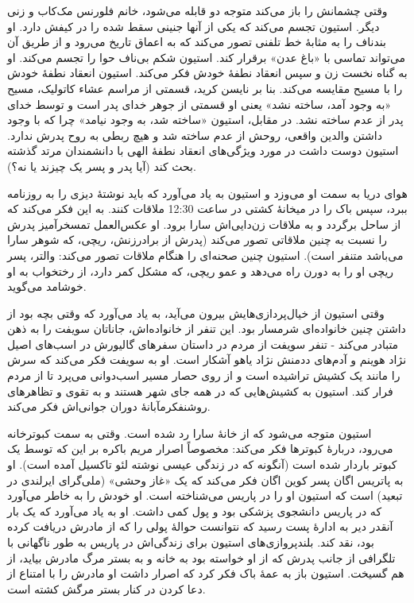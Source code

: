 \documentclass[12pt]{book}
\begin{document}
    وقتی چشمانش را باز می‌کند متوجه دو قابله می‌شود، خانم فلورنس مک‌کاب و زنی دیگر. استیون تجسم می‌کند که یکی از آنها جنینی سقط شده را در کیفش دارد. او بندناف را به مثابۀ خط تلفنی تصور می‌کند که به اعماق تاریخ می‌رود و از طریق آن می‌تواند تماسی با «باغ عدن» برقرار کند. استیون شکم بی‌ناف حوا را تجسم می‌کند. او به گناه نخست زن و سپس انعقاد نطفۀ خودش فکر می‌کند. استیون انعقاد نطفۀ خودش را با مسیح مقایسه می‌کند. بنا بر نایسن کرید، قسمتی از مراسم عشاء کاتولیک، مسیح «به وجود آمد، ساخته نشد» یعنی او قسمتی از جوهر خدای پدر است و توسط خدای پدر از عدم ساخته نشد. در مقابل، استیون «ساخته شد، به وجود نیامد» چرا که با وجود داشتن والدین واقعی، روحش از عدم ساخته شد و هیچ ربطی به روح پدرش ندارد. استیون دوست داشت در مورد ویژگی‌های انعقاد نطفۀ الهی با دانشمندان مرتد گذشته بحث کند (آیا پدر و پسر یک چیزند یا نه؟).

    هوای دریا به سمت او می‌وزد و استیون به یاد می‌آورد که باید نوشتۀ دیزی را به روزنامه ببرد، سپس باک را در میخانۀ کشتی در ساعت 12:30 ملاقات کنند. به این فکر می‌کند که از ساحل برگردد و به ملاقات زن‌دایی‌اش سارا برود. او عکس‌العمل تمسخرآمیز پدرش را نسبت به چنین ملاقاتی تصور می‌کند (پدرش از برادرزنش، ریچی، که شوهر سارا می‌باشد متنفر است). استیون چنین صحنه‌ای را هنگام ملاقات تصور می‌کند: والتر، پسر ریچی او را به دورن راه می‌دهد و عمو ریچی، که مشکل کمر دارد، از رختخواب به او خوشامد می‌گوید.

    وقتی استیون از خیال‌پردازی‌هایش بیرون می‌آید، به یاد می‌آورد که وقتی بچه بود از داشتن چنین خانواده‌ای شرمسار بود. این تنفر از خانواده‌اش، جاناتان سویفت را به ذهن متبادر می‌کند - تنفر سویفت از مردم در داستان سفرهای گالیورش در اسب‌های اصیل نژاد هوینم و آدم‌های ددمنش نژاد یاهو آشکار است. او به سویفت فکر می‌کند که سرش را مانند یک کشیش تراشیده است و از روی حصار مسیر اسب‌دوانی می‌پرد تا از مردم فرار کند. استیون به کشیش‌هایی که در همه جای شهر هستند و به تقوی و تظاهرهای روشنفکرمآبانۀ دوران جوانی‌اش فکر می‌کند.

    استیون متوجه می‌شود که از خانۀ سارا رد شده است. وقتی به سمت کبوترخانه می‌رود، دربارۀ کبوترها فکر می‌کند: مخصوصاً اصرار مریم باکره بر این که توسط یک کبوتر باردار شده است (آنگونه که در زندگی عیسی نوشته لئو تاکسیل آمده است). او به پاتریس اگان پسر کوین اگان فکر می‌کند که یک «غاز وحشی» (ملی‌گرای ایرلندی در تبعید) است که استیون او را در پاریس می‌شناخته است. او خودش را به خاطر می‌آورد که در پاریس دانشجوی پزشکی بود و پول کمی داشت. او به یاد می‌آورد که یک بار آنقدر دیر به ادارۀ پست رسید که نتوانست حوالۀ پولی را که از مادرش دریافت کرده بود، نقد کند. بلندپروازی‌های استیون برای زندگی‌اش در پاریس به طور ناگهانی با تلگرافی از جانب پدرش که از او خواسته بود به خانه و به بستر مرگ مادرش بیاید، از هم گسیخت. استیون باز به عمۀ باک فکر کرد که اصرار داشت او مادرش را با امتناع از دعا کردن در کنار بستر مرگش کشته است.
\end{document}
